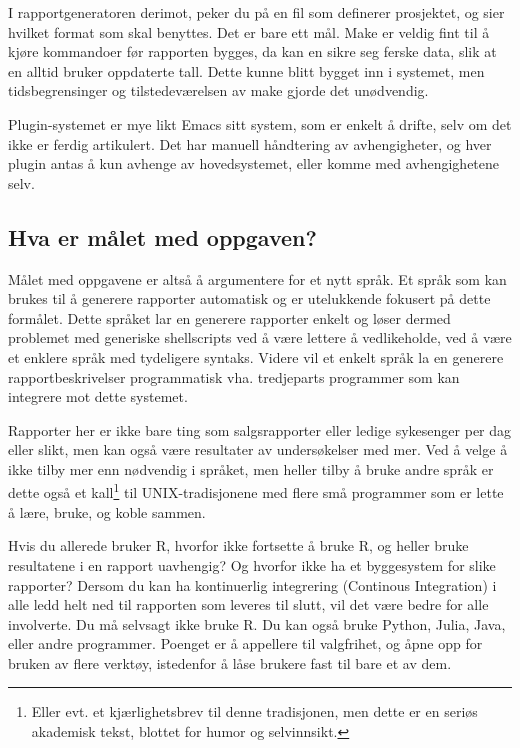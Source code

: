 \documentclass[norsk, 11pt, a4paper]{article}
\begin{document}
I rapportgeneratoren derimot, peker du på en fil som definerer prosjektet, og sier hvilket format som skal benyttes. Det er bare ett mål.
Make er veldig fint til å kjøre kommandoer før rapporten bygges, da kan en sikre seg ferske data, slik at en alltid bruker oppdaterte tall.
Dette kunne blitt bygget inn i systemet, men tidsbegrensinger og tilstedeværelsen av make gjorde det unødvendig.



Plugin-systemet er mye likt Emacs sitt system, som er enkelt å drifte, selv om det ikke er ferdig artikulert. Det har manuell håndtering av avhengigheter, og hver plugin antas å kun avhenge av hovedsystemet, eller komme med avhengighetene selv.



\subsection{Hva er målet med oppgaven?}



Målet med oppgavene er altså å argumentere for et nytt språk. Et språk som kan brukes til å generere rapporter automatisk og er utelukkende fokusert på dette formålet. Dette språket lar en generere rapporter enkelt og løser dermed problemet med generiske shellscripts ved å være lettere å vedlikeholde, ved å være et enklere språk med tydeligere syntaks. Videre vil et enkelt språk la en generere rapportbeskrivelser programmatisk vha. tredjeparts programmer som kan integrere mot dette systemet.



Rapporter her er ikke bare ting som salgsrapporter eller ledige sykesenger per dag eller slikt, men kan også være resultater av undersøkelser med mer.
Ved å velge å ikke tilby mer enn nødvendig i språket, men heller tilby å bruke andre språk er dette også et kall\footnote{Eller evt. et kjærlighetsbrev til denne tradisjonen, men dette er en seriøs akademisk tekst, blottet for humor og selvinnsikt.} til UNIX-tradisjonene med flere små programmer som er lette å lære, bruke, og koble sammen.



Hvis du allerede bruker R, hvorfor ikke fortsette å bruke R, og heller bruke resultatene i en rapport uavhengig? Og hvorfor ikke ha et byggesystem for slike rapporter? Dersom du kan ha kontinuerlig integrering (Continous Integration) i alle ledd helt ned til rapporten som leveres til slutt, vil det være bedre for alle involverte. Du må selvsagt ikke bruke R. Du kan også bruke Python, Julia, Java, eller andre programmer. Poenget er å appellere til valgfrihet, og åpne opp for bruken av flere verktøy, istedenfor å låse brukere fast til bare et av dem.
\end{document}
